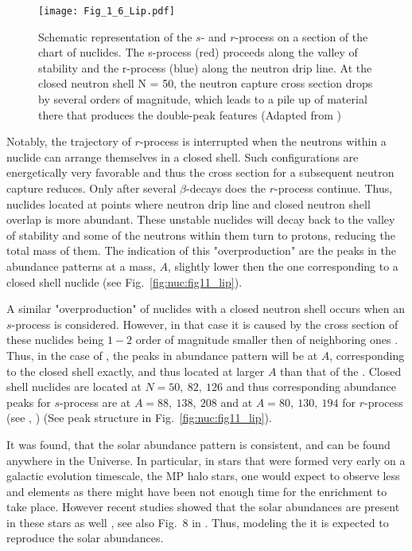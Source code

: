 \begin{figure}[t]
    \centering
    \texttt{[image: Fig\_1\_6\_Lip.pdf]}
    \caption{Schematic representation of the $s$- and $r$-process on a section of the
        chart of nuclides. The s-process (red) proceeds along the valley of stability and the
        r-process (blue) along the neutron drip line. At the closed neutron shell N = 50, the
        neutron capture cross section drops by several orders of magnitude, which leads to a
        pile up of material there that produces the double-peak features
        (Adapted from \citet{Lippuner:2018phd})
    }
    \label{fig:nuc:fig16_lip}
\end{figure}
%
Notably, the trajectory of $r$-process is interrupted when the neutrons within a nuclide can arrange 
themselves in a closed shell. Such configurations are energetically very favorable and thus the cross 
section for a subsequent neutron capture reduces. Only after several $\beta$-decays does the $r$-process
continue. Thus, nuclides located at points where neutron drip line and closed neutron shell overlap is more
abundant. These unstable nuclides will decay back to the valley of stability and some of the neutrons 
within them turn to protons, reducing the total mass of them. The indication of this "overproduction" 
are the peaks in the abundance patterns at a mass, $A$, slightly lower then the one corresponding to a 
closed shell nuclide (see Fig.~\ref{fig:nuc:fig11_lip}).


A similar "overproduction" of nuclides with a closed neutron shell occurs when an $s$-process is considered.
However, in that case it is caused by the cross section of these nuclides being $1-2$ order of magnitude smaller
then of neighboring ones \citep{Rolfs:1988}. Thus, in the case of \sproc{}, the peaks in abundance pattern will
be at $A$, corresponding to the closed shell exactly, and thus located at larger $A$ than that of the \rproc{}. 
Closed shell nuclides are located at $N=50,\: 82, \: 126$ and thus corresponding abundance peaks for $s$-process 
are at $A=88, \: 138, \: 208$ and at $A=80,\:130,\:194$ for $r$-process (see \eg, \citet{Arnould:2007gh}) 
(See peak structure in Fig.~\ref{fig:nuc:fig11_lip}).

It was found, that the solar \rproc{} abundance pattern is consistent, and can be found anywhere in the 
Universe. In particular, in stars that were formed very early on a galactic evolution timescale, the 
\ac{MP} halo stars, one would expect to observe less \sproc{} and \rproc{} elements as there might have 
been not enough time for the enrichment to take place. However recent studies showed that the solar \rproc{}
abundances are present in these stars as well \citep{Sneden:2008,Roederer:2010}, see also Fig.~$8$ in
\citet{Sneden:2009}. Thus, modeling the \rproc{} \nuc{} it is expected to reproduce the solar abundances.

